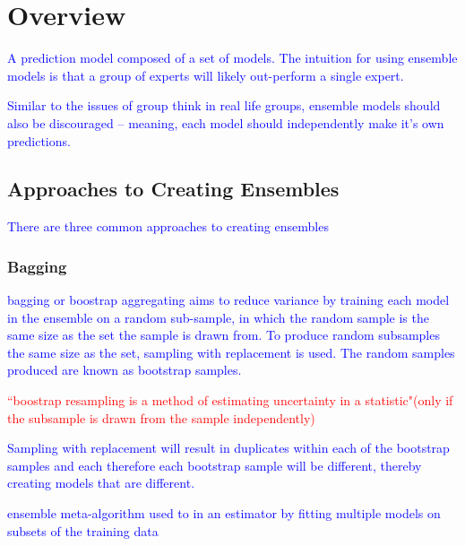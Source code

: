 \section{Overview}


\textcolor{blue}{A prediction model composed of a set of models. The intuition for using ensemble models is that a group of experts will likely out-perform a single expert.}

\textcolor{blue}{Similar to the issues of group think in real life groups, ensemble models should also be discouraged -- meaning, each model should independently make it's own predictions.}


\subsection{Approaches to Creating Ensembles}

\textcolor{blue}{There are three common approaches to creating ensembles}

\subsubsection{Bagging}

\textcolor{blue}{{bagging} or {boostrap aggregating} aims to reduce variance by training each model in the ensemble on a random sub-sample, in which the random sample is the same size as the set the sample is drawn from. To produce random subsamples the same size as the set, {sampling with replacement} is used. The random samples produced are known as {bootstrap samples}.}

\textcolor{red}{``boostrap resampling is a method of estimating uncertainty in a statistic"(only if the subsample is drawn from the sample independently)}

\textcolor{blue}{Sampling with replacement will result in duplicates within each of the bootstrap samples and each therefore each bootstrap sample will be different, thereby creating models that are different.}

\textcolor{blue}{ensemble meta-algorithm used to  in an estimator by fitting multiple models on subsets of the training data}

